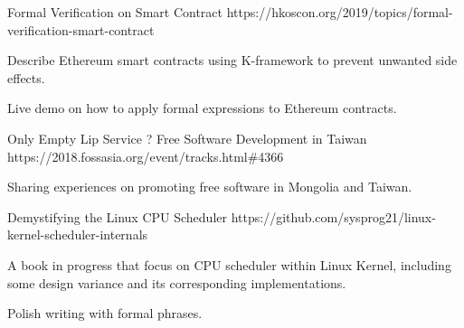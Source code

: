 \begin{cventries}
            \vspace{-3mm}
  
            \cventry
              {} %
              {Formal Verification on Smart Contract} %
              {} %
              {https://hkoscon.org/2019/topics/formal\linebreak-verification-smart-contract} %
              {
                \vspace{-2mm}
                \begin{cvitems} %
                  \item {Describe Ethereum smart contracts using K-framework to prevent unwanted side effects.}
                  \item {Live demo on how to apply formal expressions to Ethereum contracts.}
                \end{cvitems}
              }

              \cventry
              {} %
              {Only Empty Lip Service ? Free Software Development in Taiwan} %
              {} %
              {https://2018.fossasia.org\linebreak/event/tracks.html\#4366} %
              {
                \vspace{-2mm}
                \begin{cvitems} %
                  \item {Sharing experiences on promoting free software in Mongolia and Taiwan.}
                \end{cvitems}
              }

              \vspace{-3mm}
  
              \cventry
                {} %
                {Demystifying the Linux CPU Scheduler} %
                {} %
                {https://github.com/sysprog21/linux\linebreak-kernel-scheduler-internals} %
                {
                  \vspace{-2mm}
                  \begin{cvitems} %
                    \item {A book in progress that focus on CPU scheduler within Linux Kernel, including some design variance and its
                    corresponding implementations.}
                    \item {Polish writing with formal phrases.}
                  \end{cvitems}
                }

\end{cventries}
